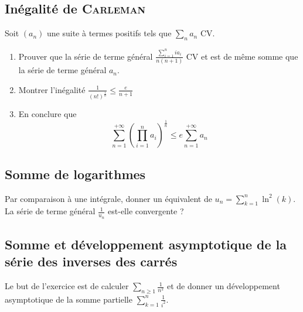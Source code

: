\subsection{Inégalité de \textsc{Carleman}}

Soit $(a_n)$ une suite à termes positifs tels que $\sum_na_n$ CV.

\begin{enumerate}
    \item Prouver que la série de terme général $\frac{\sum_{i=1}^n ia_i}{n(n+1)}$ CV et est de même somme que la série de terme général $a_n$.
    \item Montrer l'inégalité $\frac{1}{(n!)^{\frac{1}{n}}} \leqslant \frac{e}{n+1}$
    \item En conclure que $$\sum_{n=1}^{+\infty}\left(\prod_{i=1}^n a_i\right)^\frac{1}{n} \leqslant e \sum_{n=1}^{+\infty} a_n$$
\end{enumerate}

\subsection{Somme de logarithmes}

Par comparaison à une intégrale, donner un équivalent de $u_n = \sum_{k=1}^n\ln^2(k)$. La série de terme général $\frac{1}{u_n}$ est-elle convergente ?

\subsection{Somme et développement asymptotique de la série des inverses des carrés}

Le but de l'exercice est de calculer $\sum_{n\geqslant 1}\frac{1}{n^2}$ et de donner un développement asymptotique de la somme partielle $\sum_{k=1}^n\frac{1}{i^2}$.


